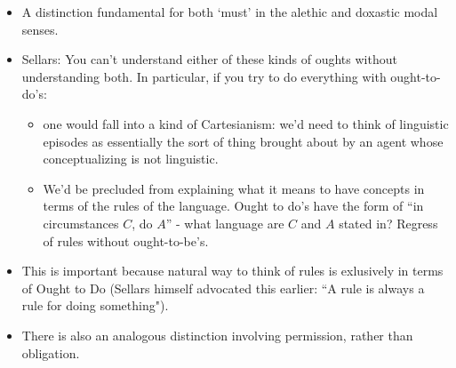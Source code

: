 \begin{itemize}
\item A distinction fundamental for both `must' in the alethic and doxastic modal senses.

\item Sellars: You can't understand either of these kinds of oughts without understanding both. In particular, if you try to do everything with ought-to-do's:
 \begin{itemize}
 \item one would fall into a kind of Cartesianism: we'd need to think of linguistic episodes as essentially the sort of thing brought about by an agent whose conceptualizing is not linguistic.
 \item We'd be precluded from explaining what it means to have concepts in terms of the rules of the language. Ought to do's have the form of ``in circumstances $C$, do $A$'' - what language are $C$ and $A$ stated in? Regress of rules without ought-to-be's.
 \end{itemize}

\item This is important because natural way to think of rules is exlusively in terms of Ought to Do (Sellars himself advocated this earlier: ``A rule is always a rule for doing something"\cite{sellars1954some}).

\item There is also an analogous distinction involving permission, rather than obligation.

\end{itemize}



